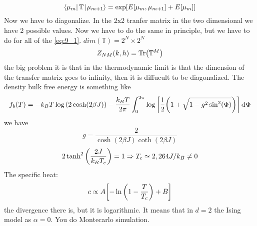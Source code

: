 \documentclass[../main/main.tex]{subfiles}
\begin{document}
\begin{equation}
  \bra{\mu _m} \mathbb{T} \ket{\mu _{m+1}} = \exp [ E [\mu _m, \mu _{m+1}] + E [ \mu _m]]
\end{equation}
Now we have to diagonalize. In the 2x2 tranfer matrix in the two dimensional we have 2 possible values. Now we have to do the same in principle, but we have to do for all of the \eqref{eq:9_1}.
\( dim(\mathbb{T}) = 2^N \times 2^N \)
\begin{equation}
  Z_{NM} (k,h) = \Tr(\mathbb{T}^M)
\end{equation}
the big problem it is that in the thermodynamic limit is that the dimension of the transfer matrix goes to infinity, then it is diffucult to be diagonalized.
The density bulk free energy is something like
\begin{equation}
  f_b (T) = -k_B T \log{\qty(2 \cosh(2 \beta J))- \frac{k_B T}{2 \pi} \int_{0}^{2\pi} \log{\qty[\frac{1}{2}\qty(1+ \sqrt{1-g^2 \sin^2(\Phi) } )] } \dd[]{\Phi }  }
\end{equation}
we have
\begin{equation}
  g = \frac{2}{\cosh(2 \beta J)\coth(2 \beta J)}
\end{equation}
\begin{equation}
  2 \tanh^2 \qty(\frac{2J}{k_B T_c}) = 1 \Rightarrow T_c \simeq 2,264 J/k_B \neq 0
\end{equation}
The specific heat:
\begin{equation}
  c \propto A \qty[-\ln{\qty(1- \frac{T}{T_c}) } + B  ]
\end{equation}
the divergence there is, but it is logarithmic. It means that in \( d=2 \)  the Ising model as \( \alpha =0 \). You do Montecarlo simulation.    
\end{document}
